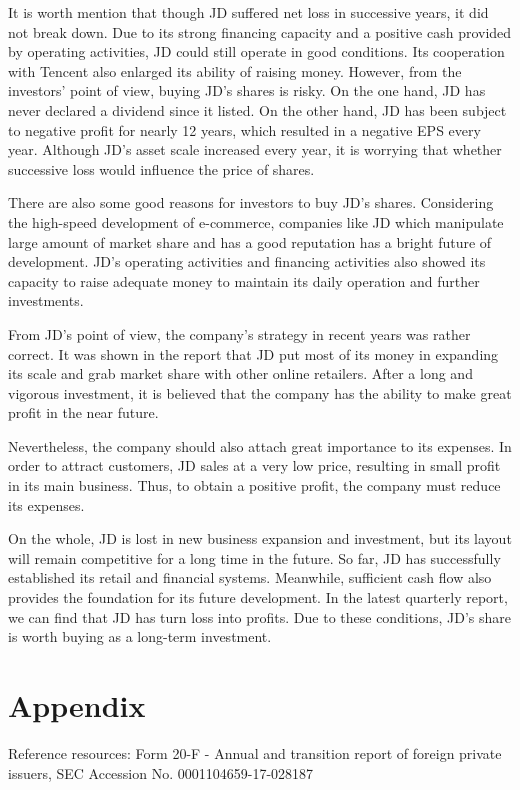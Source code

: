 It is worth mention that though JD suffered net loss in successive years, it did not break down. Due to its strong financing capacity and a positive cash provided by operating activities, JD could still operate in good conditions. Its cooperation with Tencent also enlarged its ability of raising money.
However, from the investors’ point of view, buying JD’s shares is risky. On the one hand, JD has never declared a dividend since it listed. On the other hand, JD has been subject to negative profit for nearly 12 years, which resulted in a negative EPS every year. Although JD’s asset scale increased every year, it is worrying that whether successive loss would influence the price of shares.

There are also some good reasons for investors to buy JD’s shares. Considering the high-speed development of e-commerce, companies like JD which manipulate large amount of market share and has a good reputation has a bright future of development. JD’s operating activities and financing activities also showed its capacity to raise adequate money to maintain its daily operation and further investments.

From JD’s point of view, the company’s strategy in recent years was rather correct. It was shown in the report that JD put most of its money in expanding its scale and grab market share with other online retailers. After a long and vigorous investment, it is believed that the company has the ability to make great profit in the near future.

Nevertheless, the company should also attach great importance to its expenses. In order to attract customers, JD sales at a very low price, resulting in small profit in its main business. Thus, to obtain a positive profit, the company must reduce its expenses.

On the whole, JD is lost in new business expansion and investment, but its layout will remain competitive for a long time in the future. So far, JD has successfully established its retail and financial systems. Meanwhile, sufficient cash flow also provides the foundation for its future development. In the latest quarterly report, we can find that JD has turn loss into profits. Due to these conditions, JD’s share is worth buying as a long-term investment.

\newpage
\section*{Appendix}
Reference resources: Form 20-F - Annual and transition report of foreign private issuers, SEC Accession No. 0001104659-17-028187

